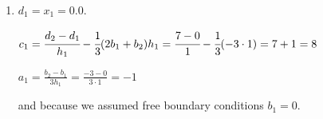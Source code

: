 \documentclass[12pt, xcolor=dvipsnames,svgnames,x11names]{article}
\makeatletter
\newenvironment{multiequation}[1][]{%
\begin{equation}%
   \begin{aligned}%
   \ifx#1\@empty\else\label{#1}\fi%
}{%
   \end{aligned}%
\end{equation}%
}
\makeatother
\begin{document}
\begin{answerbox}
\begin{enumerate}
The full systems of equations for $b_2$ to $b_4$ is given by 
 
\begin{multiequation}
\begin{bmatrix}
4  &   1  &  0\\
1  &   6  &  2\\
0  &   2  &   6
\end{bmatrix} \begin{bmatrix}
b_2 \\ b_3 \\ b_4
\end{bmatrix} = \begin{bmatrix}
\frac{3(d_3-d_2)}{h_2} - \frac{3(d_2-d_1)}{h_1} \\
\frac{3(d_4-d_3)}{h_3} - \frac{3(d_3-d_2)}{h_2} \\
\frac{3(d_5-d_4)}{h_4} - \frac{3(d_4-d_3)}{h_3} 
\end{bmatrix} = \begin{bmatrix}
\frac{3(9-7)}{1} - \frac{3(7-0)}{1} \\
\frac{3(3-9)}{2} - \frac{3(9-7)}{1} \\
\frac{3(4-3)}{1} - \frac{3(3-9)}{2}
 \end{bmatrix} = \begin{bmatrix}
 -15\\-15\\12
 \end{bmatrix}
\end{multiequation}

which upon solving using MATLAB gives $b_2 = -3$, $b_3 = -3$, and $b_4 = 3.0$.




\item $d_1 = x_1 = 0.0$.

$c_1 = \cfrac{d_2 - d_1}{h_1} - \cfrac{1}{3}(2b_1 + b_2)h_1 = \cfrac{7-0}{1}-\cfrac{1}{3}{(-3\cdot 1)} = 7 +1 = 8$  

$a_1 = \frac{b_2 - b_1}{3h_1} = \frac{-3-0}{3\cdot 1} = -1$

and because we assumed free boundary conditions $b_1 = 0$.

\end{enumerate}


\end{answerbox}
\end{document}
